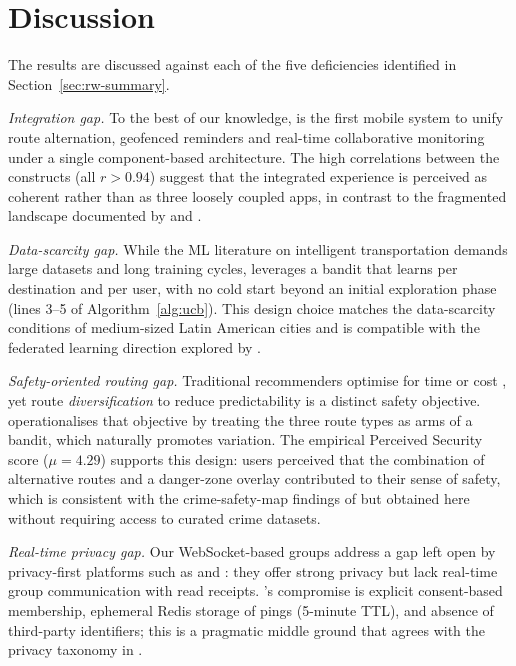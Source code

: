 \documentclass[a4paper,fleqn]{cas-sc}
\begin{document}
	\section{Discussion}\label{sec:discussion}
	
	The results are discussed against each of the five deficiencies identified in Section~\ref{sec:rw-summary}.
	
	\emph{Integration gap.} To the best of our knowledge, \RUTAI{} is the first mobile system to unify route alternation, geofenced reminders and real-time collaborative monitoring under a single component-based architecture. The high correlations between the \TAM{} constructs (all $r>0.94$) suggest that the integrated experience is perceived as coherent rather than as three loosely coupled apps, in contrast to the fragmented landscape documented by \citet{paiva2021smartmobility} and \citet{kung2023lbs}.
	
	\emph{Data-scarcity gap.} While the ML literature on intelligent transportation \citep{yuan2022mlits,liu2022multimodal,zhang2025drlnavigation} demands large datasets and long training cycles, \RUTAI{} leverages a \UCB{} bandit \citep{bouneffouf2020mabsurvey,zeng2016mab} that learns per destination and per user, with no cold start beyond an initial exploration phase (lines 3--5 of Algorithm~\ref{alg:ucb}). This design choice matches the data-scarcity conditions of medium-sized Latin American cities and is compatible with the federated learning direction explored by \citet{shi2021fedmab}.
	
	\emph{Safety-oriented routing gap.} Traditional recommenders optimise for time or cost \citep{campigotto2017favour,guo2021online}, yet route \emph{diversification} to reduce predictability is a distinct safety objective. \RUTAI{} operationalises that objective by treating the three route types as arms of a bandit, which naturally promotes variation. The empirical Perceived Security score ($\mu=4.29$) supports this design: users perceived that the combination of alternative routes and a danger-zone overlay contributed to their sense of safety, which is consistent with the crime-safety-map findings of \citet{kim2025crimesafetymap} but obtained here without requiring access to curated crime datasets.
	
	\emph{Real-time privacy gap.} Our WebSocket-based groups address a gap left open by privacy-first platforms such as \citet{mckenzie2022privyto} and \citet{shokri2014mobicrowd}: they offer strong privacy but lack real-time group communication with read receipts. \RUTAI{}'s compromise is explicit consent-based membership, ephemeral Redis storage of pings (5-minute TTL), and absence of third-party identifiers; this is a pragmatic middle ground that agrees with the privacy taxonomy in \citet{li2017locsharing}.
	
\end{document}
